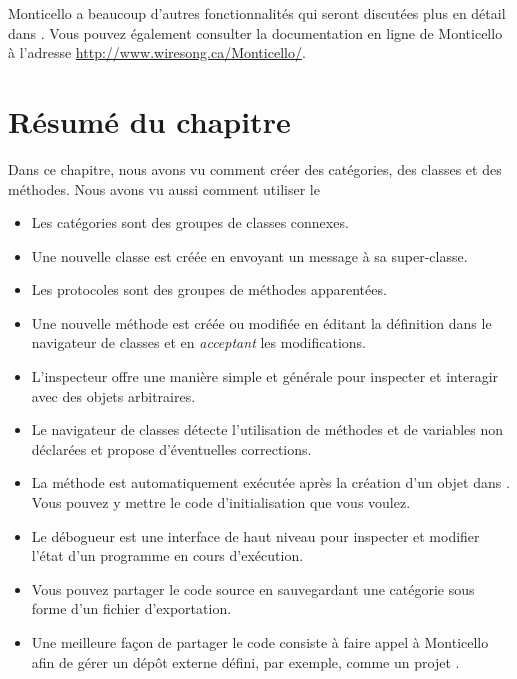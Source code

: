 \documentclass[a4paper,10pt,twoside]{book}
\begin{document}

Monticello a beaucoup d'autres fonctionnalités qui seront discutées
plus en détail dans .
Vous pouvez également consulter la documentation en ligne de
Monticello à l'adresse \url{http://www.wiresong.ca/Monticello/}.

\section{Résumé du chapitre}
Dans ce chapitre, nous avons vu comment créer des catégories, des classes
et des méthodes. Nous avons vu aussi comment utiliser le 

\begin{itemize}
  \item Les catégories sont des groupes de classes connexes.
  \item Une nouvelle classe est créée en envoyant un message à sa super-classe.
  \item Les protocoles sont des groupes de méthodes apparentées.
  \item Une nouvelle méthode est créée ou modifiée en éditant la définition dans le navigateur de classes et en \emph{acceptant} les modifications.
  \item L'inspecteur offre une manière simple et générale pour inspecter et interagir avec des objets arbitraires.
  \item Le navigateur de classes détecte l'utilisation de méthodes et de variables non déclarées et propose d'éventuelles corrections.
  \item La méthode  est automatiquement exécutée après
    la création d'un objet dans \pharo. Vous pouvez y mettre
    le code d'initialisation que vous voulez.
  \item Le débogueur est une interface de haut niveau pour inspecter et modifier l'état d'un programme en cours d'exécution.
  \item Vous pouvez partager le code source en sauvegardant une
    catégorie sous forme d'un fichier d'exportation.
  \item Une meilleure façon de partager le code consiste à faire
    appel à Monticello afin de gérer un dépôt externe défini, par
    exemple, comme un projet \sqsrc.
\end{itemize}

\ifx\wholebook\relax\else
\end{document}
